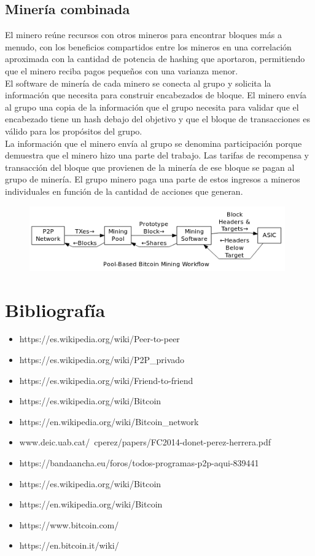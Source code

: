 \documentclass[11pt,a4paper]{article}
\begin{document}
\subsection{Minería combinada}

El minero reúne recursos con otros mineros para encontrar bloques más a menudo, con los beneficios compartidos entre los mineros en una correlación aproximada con la cantidad de potencia de hashing que aportaron, permitiendo que el minero reciba pagos pequeños con una varianza menor.\\

El software de minería de cada minero se conecta al grupo y solicita la información que necesita para construir encabezados de bloque. El minero envía al grupo una copia de la información que el grupo necesita para validar que el encabezado tiene un hash debajo del objetivo y que el bloque de transacciones es válido para los propósitos del grupo.\\

La información que el minero envía al grupo se denomina participación porque demuestra que el minero hizo una parte del trabajo. Las tarifas de recompensa y transacción del bloque que provienen de la minería de ese bloque se pagan al grupo de minería. El grupo minero paga una parte de estos ingresos a mineros individuales en función de la cantidad de acciones que generan.

\begin{figure}[h]
	\includegraphics[width=11cm]{Image6.png}
	\centering		
	\caption{}
	\label{p5}
\end{figure}

\section{Bibliografía}
\begin{itemize}
	\item https://es.wikipedia.org/wiki/Peer-to-peer
	\item https://es.wikipedia.org/wiki/P2P\_privado
	\item https://es.wikipedia.org/wiki/Friend-to-friend
	\item https://es.wikipedia.org/wiki/Bitcoin
	\item https://en.wikipedia.org/wiki/Bitcoin\_network
	\item www.deic.uab.cat/~cperez/papers/FC2014-donet-perez-herrera.pdf
	\item https://bandaancha.eu/foros/todos-programas-p2p-aqui-839441
	\item https://es.wikipedia.org/wiki/Bitcoin
	\item https://en.wikipedia.org/wiki/Bitcoin
	\item https://www.bitcoin.com/
	\item https://en.bitcoin.it/wiki/
\end{itemize}
\end{document}

